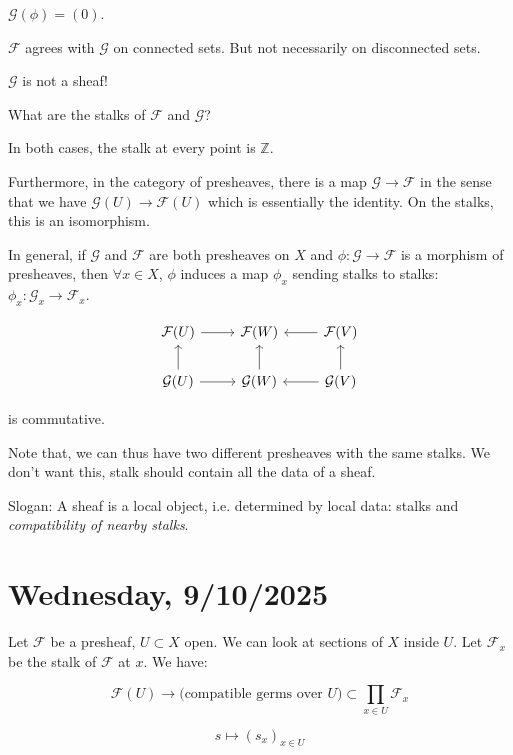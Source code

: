 \documentclass{article}
\theoremstyle{definition}
\begin{document}
    \(\mathcal{G}(\phi) = (0)\).

    \(\mathcal{F}\) agrees with \(\mathcal{G}\) on connected sets. But not necessarily on disconnected sets.

    \(\mathcal{G}\) is not a sheaf!

    What are the stalks of \(\mathcal{F}\) and \(\mathcal{G}\)?

    In both cases, the stalk at every point is \(\mathbb{Z}\).

    Furthermore, in the category of presheaves, there is a map \(\mathcal{G} \to \mathcal{F}\) in the sense that we have \(\mathcal{G}(U) \to \mathcal{F}(U)\) which is essentially the identity. On the stalks, this is an isomorphism.

    In general, if \(\mathcal{G}\) and \(\mathcal{F}\) are both presheaves on \(X\) and \(\phi: \mathcal{G} \to \mathcal{F}\) is a morphism of presheaves, then \(\forall x\in X\), \(\phi\) induces a map \(\phi_x\) sending stalks to stalks: \(\phi_x : \mathcal{G}_x \to \mathcal{F}_x\).

    \[
        \begin{tikzcd}
            \mathcal{F}(U) \ar[r] & \mathcal{F}(W) & \mathcal{F}(V) \ar[l] \\ \mathcal{G}(U) \ar[u] \ar[r] & \mathcal{G}(W) \ar[u] & \mathcal{G} (V) \ar[u] \ar[l]
        \end{tikzcd}
    \]

    is commutative.

    Note that, we can thus have two different presheaves with the same stalks. We don't want this, stalk should contain all the data of a sheaf.

    Slogan: A sheaf is a local object, i.e. determined by local data: stalks and \textit{compatibility of nearby stalks}.

    \section*{Wednesday, 9/10/2025}
    
    Let \(\mathcal{F}\) be a presheaf, \(U \subset X\) open. We can look at sections of \(X\) inside \(U\). Let \(\mathcal{F}_x\) be the stalk of \(\mathcal{F}\) at \(x\). We have:

    \[
        \mathcal{F}(U) \to \text{(compatible germs over \(U\))} \subset \prod_{x\in U} \mathcal{F}_x 
    \]

    \[
        s \mapsto (s_x)_{x\in U}
    \]
\end{document}
